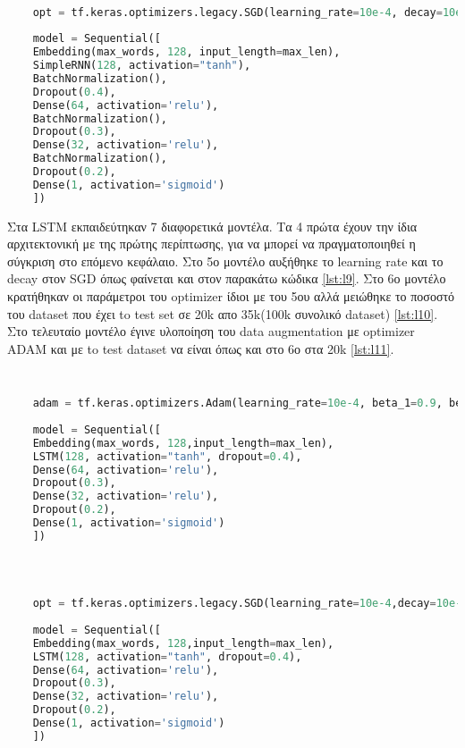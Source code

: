 \begin{lstlisting}[language=Python, label={lst:l4},caption=Fourth RNN]
	

	opt = tf.keras.optimizers.legacy.SGD(learning_rate=10e-4, decay=10e-6, momentum=0.6)
	
	model = Sequential([
	Embedding(max_words, 128, input_length=max_len),
	SimpleRNN(128, activation="tanh"),
	BatchNormalization(),
	Dropout(0.4),
	Dense(64, activation='relu'),
	BatchNormalization(),
	Dropout(0.3),
	Dense(32, activation='relu'),
	BatchNormalization(),
	Dropout(0.2),
	Dense(1, activation='sigmoid')
	])

\end{lstlisting}
\clearpage



Στα LSTM εκπαιδεύτηκαν 7 διαφορετικά μοντέλα. Τα 4 πρώτα έχουν την ίδια αρχιτεκτονική με της πρώτης περίπτωσης, για να μπορεί να πραγματοποιηθεί η σύγκριση στο επόμενο κεφάλαιο. Στο 5ο μοντέλο αυξήθηκε το learning rate και το decay στον SGD όπως φαίνεται και στον παρακάτω κώδικα \ref{lst:l9}. Στο 6ο μοντέλο κρατήθηκαν οι παράμετροι του optimizer ίδιοι με του 5ου αλλά μειώθηκε το ποσοστό του dataset που έχει to test set σε 20k απο 35k(100k συνολικό dataset) \ref{lst:l10}. Στο τελευταίο μοντέλο έγινε υλοποίηση του data augmentation με optimizer ADAM και με to test dataset να είναι όπως και στο 6ο στα 20k \ref{lst:l11}.

\begin{lstlisting}[language=Python, label={lst:l5},caption=First LSTM]
	
	
	adam = tf.keras.optimizers.Adam(learning_rate=10e-4, beta_1=0.9, beta_2=0.999, epsilon=1e-7)
	
	model = Sequential([
	Embedding(max_words, 128,input_length=max_len),
	LSTM(128, activation="tanh", dropout=0.4),
	Dense(64, activation='relu'),
	Dropout(0.3),
	Dense(32, activation='relu'),
	Dropout(0.2),
	Dense(1, activation='sigmoid')
	])

	
\end{lstlisting}


\begin{lstlisting}[language=Python, label={lst:l6},caption=Second LSTM]
	
	opt = tf.keras.optimizers.legacy.SGD(learning_rate=10e-4,decay=10e-6,momentum = 0.6)
	
	model = Sequential([
	Embedding(max_words, 128,input_length=max_len),
	LSTM(128, activation="tanh", dropout=0.4),
	Dense(64, activation='relu'),
	Dropout(0.3),
	Dense(32, activation='relu'),
	Dropout(0.2),
	Dense(1, activation='sigmoid')
	])
	
\end{lstlisting}


